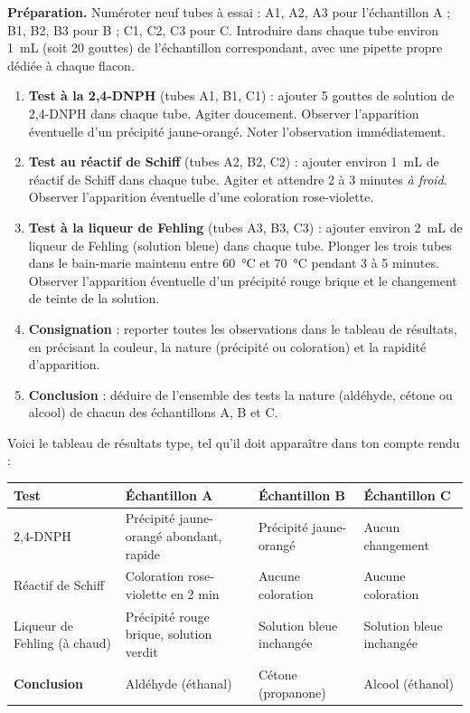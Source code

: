 \documentclass[11pt]{article}
\newcounter{popsec}
\newcounter{popsub}
\newcommand{\courssub}[1]{%
  \stepcounter{popsub}%
  \par\vspace{9pt}\noindent{\popxbold\fontsize{11.5}{13}\selectfont\color{popink}{\color{poporange}\thepopsec.\thepopsub}\hspace{6pt}#1}\par\nopagebreak\vspace{4pt}
}
\begin{document}
\begin{methode}
\textbf{Préparation.} Numéroter neuf tubes à essai : A1, A2, A3 pour l'échantillon A ; B1, B2, B3 pour B ; C1, C2, C3 pour C. Introduire dans chaque tube environ \SI{1}{mL} (soit 20 gouttes) de l'échantillon correspondant, avec une pipette propre dédiée à chaque flacon.

\begin{enumerate}
\item \textbf{Test à la 2,4-DNPH} (tubes A1, B1, C1) : ajouter 5 gouttes de solution de 2,4-DNPH dans chaque tube. Agiter doucement. Observer l'apparition éventuelle d'un précipité jaune-orangé. Noter l'observation immédiatement.
\item \textbf{Test au réactif de Schiff} (tubes A2, B2, C2) : ajouter environ \SI{1}{mL} de réactif de Schiff dans chaque tube. Agiter et attendre 2 à 3 minutes \emph{à froid}. Observer l'apparition éventuelle d'une coloration rose-violette.
\item \textbf{Test à la liqueur de Fehling} (tubes A3, B3, C3) : ajouter environ \SI{2}{mL} de liqueur de Fehling (solution bleue) dans chaque tube. Plonger les trois tubes dans le bain-marie maintenu entre \SI{60}{\celsius} et \SI{70}{\celsius} pendant 3 à 5 minutes. Observer l'apparition éventuelle d'un précipité rouge brique et le changement de teinte de la solution.
\item \textbf{Consignation} : reporter toutes les observations dans le tableau de résultats, en précisant la couleur, la nature (précipité ou coloration) et la rapidité d'apparition.
\item \textbf{Conclusion} : déduire de l'ensemble des tests la nature (aldéhyde, cétone ou alcool) de chacun des échantillons A, B et C.
\end{enumerate}
\end{methode}

\courssub{Observations et résultats attendus}

Voici le tableau de résultats type, tel qu'il doit apparaître dans ton compte rendu :

\begin{center}
\begin{tabularx}{\linewidth}{|l|X|X|X|}
\hline
\rowcolor{popblueL} \textbf{Test} & \textbf{Échantillon A} & \textbf{Échantillon B} & \textbf{Échantillon C} \\
\hline
2,4-DNPH & Précipité jaune-orangé abondant, rapide & Précipité jaune-orangé & Aucun changement \\
\hline
Réactif de Schiff & Coloration rose-violette en 2 min & Aucune coloration & Aucune coloration \\
\hline
Liqueur de Fehling (à chaud) & Précipité rouge brique, solution verdit & Solution bleue inchangée & Solution bleue inchangée \\
\hline
\rowcolor{popgreenL} \textbf{Conclusion} & Aldéhyde (éthanal) & Cétone (propanone) & Alcool (éthanol) \\
\hline
\end{tabularx}
\end{center}
\end{document}
